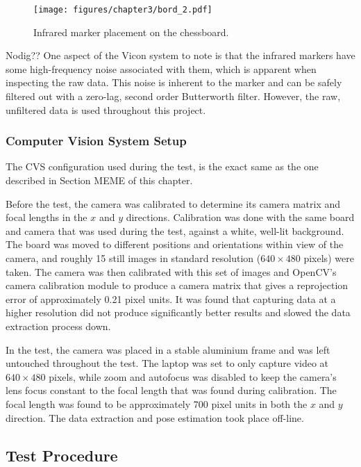 \begin{figure}
   \centering 
   \texttt{[image: figures/chapter3/bord\_2.pdf]}
   \caption{Infrared marker placement on the chessboard.}
\label{fig:chap3-board-marker-placement}
\end{figure}

Nodig?? One aspect of the Vicon system to note is that the infrared markers have some high-frequency noise associated with them, which is apparent when inspecting the raw data. This noise is inherent to the marker and can be safely filtered out with a zero-lag, second order Butterworth filter. However, the raw, unfiltered data is used throughout this project. 

\subsubsection{Computer Vision System Setup}

The CVS configuration used during the test, is the exact same as the one described in Section MEME of this chapter.

Before the test, the camera was calibrated to determine its camera matrix and focal lengths in the $x$ and $y$ directions. Calibration was done with the same board and camera that was used during the test, against a white, well-lit background. The board was moved to different positions and orientations within view of the camera, and roughly 15 still images in standard resolution ($640\times480$ pixels) were taken. The camera was then calibrated with this set of images and OpenCV's camera calibration module to produce a camera matrix that gives a reprojection error of approximately 0.21 pixel units. It was found that capturing data at a higher resolution did not produce significantly better results and slowed the data extraction process down. 

In the test, the camera was placed in a stable aluminium frame and was left untouched throughout the test. The laptop was set to only capture video at $640\times480$ pixels, while zoom and autofocus was disabled to keep the camera's lens focus constant to the focal length that was found during calibration. The focal length was found to be approximately 700 pixel units in both the $x$ and $y$ direction. The data extraction and pose estimation took place off-line. 

\subsection{Test Procedure}

